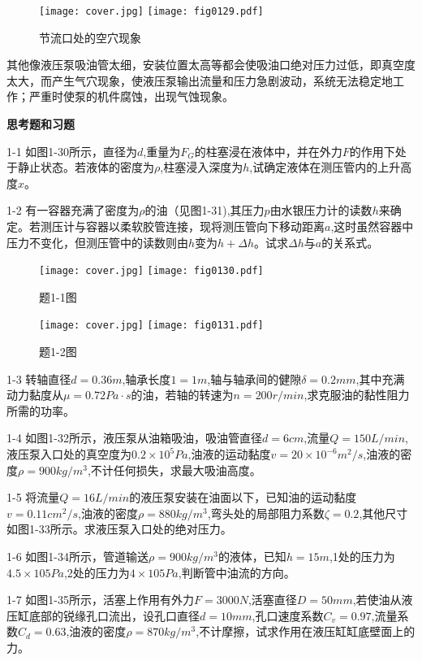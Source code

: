 \begin{figure}\centering
\ifOpenSource
\texttt{[image: cover.jpg]}   %
\else 
\texttt{[image: fig0129.pdf]}  %
\fi
\caption{节流口处的空穴现象}
\label{fig:fig0129}
\end{figure}

其他像液压泵吸油管太细，安装位置太高等都会使吸油口绝对压力过低，即真空度太大，而产生气穴现象，使液压泵输出流量和压力急剧波动，系统无法稳定地工作；严重时使泵的机件腐蚀，出现气蚀现象。

\begin{center}
 \textbf{思考题和习题}
\end{center}

1-1  如图1-30所示，直径为$d$,重量为$F_G$的柱塞浸在液体中，并在外力$F$的作用下处于静止状态。若液体的密度为$\rho $,柱塞浸入深度为$h$,试确定液体在测压管内的上升高度$x$。

1-2  有一容器充满了密度为$\rho $的油（见图1-31),其压力$p$由水银压力计的读数$h$来确定。若测压计与容器以柔软胶管连接，现将测压管向下移动距离$a$,这时虽然容器中压力不变化，但测压管中的读数则由$h$变为$h+\varDelta h$。试求$\varDelta h$与$a$的关系式。

\begin{figure}\centering
\ifOpenSource
\texttt{[image: cover.jpg]}   %
\else
\texttt{[image: fig0130.pdf]}  %
\fi
\caption{题1-1图}
\label{fig:fig0130}
\end{figure}


\begin{figure}\centering
\ifOpenSource
\texttt{[image: cover.jpg]}   %
\else 
\texttt{[image: fig0131.pdf]}  %
\fi
\caption{题1-2图}
\label{fig:fig0131}
\end{figure}

1-3  转轴直径$d=0.36m$,轴承长度$1=1m$,轴与轴承间的健隙$\delta =0.2mm$,其中充满动力黏度从$\mu =0.72Pa·s$的油，若轴的转速为$n=200r/min$,求克服油的黏性阻力所需的功率。

1-4  如图1-32所示，液压泵从油箱吸油，吸油管直径$d=6cm$,流量$Q=150L/min$,液压泵入口处的真空度为$0.2 \times 10^5Pa$,油液的运动黏度$v=20\times10^{-6}m^2/s$,油液的密度$\rho =900kg/m^3$,不计任何损失，求最大吸油高度。

1-5  将流量$Q=16L/min$的液压泵安装在油面以下，已知油的运动黏度
$ v = 0.11 cm^2 / s $,油液的密度$\rho=880kg/m^3$,弯头处的局部阻力系数$\zeta =0.2$,其他尺寸如图1-33所示。求液压泵入口处的绝对压力。

1-6  如图1-34所示，管道输送$\rho=900kg/m^3$的液体，已知$h=15m$,1处的压力为$4.5×105Pa$,2处的压力为$4×105Pa$,判断管中油流的方向。

1-7  如图1-35所示，活塞上作用有外力$F=3000N$,活塞直径$D=50mm$,若使油从液压缸底部的锐缘孔口流出，设孔口直径$d=10mm$,孔口速度系数$C_v=0.97$,流量系数$C_d=0.63$,油液的密度$\rho =870kg/m^3$,不计摩擦，试求作用在液压缸缸底壁面上的力。


